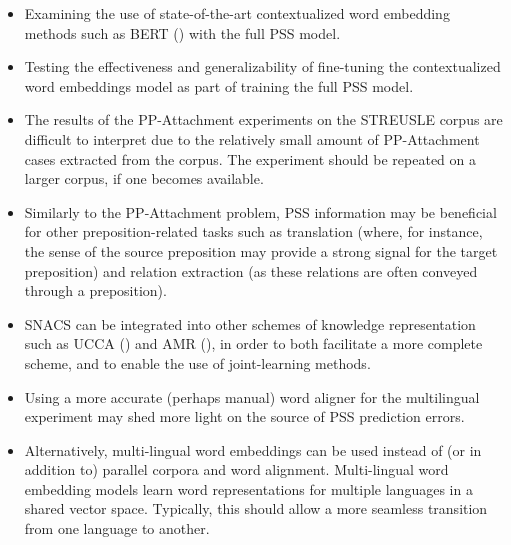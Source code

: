 \begin{itemize}
    \item Examining the use of state-of-the-art contextualized word embedding methods such as BERT (\cite{bert}) with the full PSS model. 
    \item Testing the effectiveness and generalizability of fine-tuning the contextualized word embeddings model as part of training the full PSS model.
    \item The results of the PP-Attachment experiments on the STREUSLE corpus are difficult to interpret due to the relatively small amount of PP-Attachment cases extracted from the corpus. The experiment should be repeated on a larger corpus, if one becomes available.
    \item Similarly to the PP-Attachment problem, PSS information may be beneficial for other preposition-related tasks such as translation (where, for instance, the sense of the source preposition may provide a strong signal for the target preposition) and relation extraction (as these relations are often conveyed through a preposition).
    \item SNACS can be integrated into other schemes of knowledge representation such as UCCA (\cite{ucca}) and AMR (\cite{amr}), in order to both facilitate a more complete scheme, and to enable the use of joint-learning methods.
    \item Using a more accurate (perhaps manual) word aligner for the multilingual experiment may shed more light on the source of PSS prediction errors. 
    \item Alternatively, multi-lingual word embeddings can be used instead of (or in addition to) parallel corpora and word alignment. Multi-lingual word embedding models learn word representations for multiple languages in a shared vector space. Typically, this should allow a more seamless transition from one language to another.
\end{itemize}
